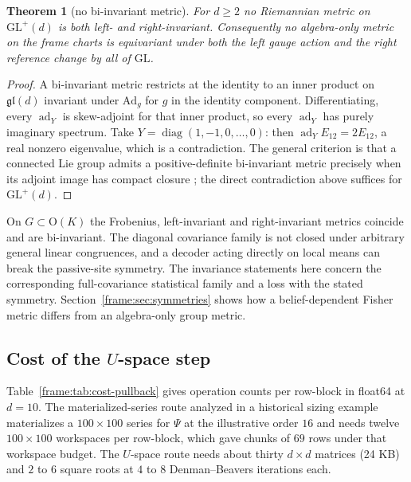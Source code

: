 \documentclass[11pt]{article}
\newtheorem{theorem}{Theorem}[section]
\theoremstyle{definition}
\theoremstyle{remark}
\providecommand{\GL}{\mathrm{GL}}
\providecommand{\gl}{\mathfrak{gl}}
\providecommand{\ad}{\operatorname{ad}}
\providecommand{\Ad}{\mathrm{Ad}}
\begin{document}
\begin{theorem}[no bi-invariant metric]\label{frame:thm:milnor}
For $d\ge2$ no Riemannian metric on $\GL^+(d)$ is both left- and right-invariant. Consequently no algebra-only metric on the frame charts is equivariant under both the left gauge action and the right reference change by all of $\GL$.
\end{theorem}
\begin{proof}
A bi-invariant metric restricts at the identity to an inner product on $\gl(d)$ invariant under $\Ad_g$ for $g$ in the identity component. Differentiating, every $\ad_Y$ is skew-adjoint for that inner product, so every $\ad_Y$ has purely imaginary spectrum. Take $Y=\operatorname{diag}(1,-1,0,\dots,0)$: then $\ad_YE_{12}=2E_{12}$, a real nonzero eigenvalue, which is a contradiction. The general criterion is that a connected Lie group admits a positive-definite bi-invariant metric precisely when its adjoint image has compact closure \cite{frame:Milnor1976}; the direct contradiction above suffices for $\GL^+(d)$.
\end{proof}

On $G\subset\mathrm{O}(K)$ the Frobenius, left-invariant and right-invariant metrics coincide and are bi-invariant. The diagonal covariance family is not closed under arbitrary general linear congruences, and a decoder acting directly on local means can break the passive-site symmetry. The invariance statements here concern the corresponding full-covariance statistical family and a loss with the stated symmetry. Section~\ref{frame:sec:symmetries} shows how a belief-dependent Fisher metric differs from an algebra-only group metric.

\subsection{Cost of the \texorpdfstring{$U$}{U}-space step}\label{frame:sec:cost-pullback}

Table~\ref{frame:tab:cost-pullback} gives operation counts per row-block in float64 at $d=10$. The materialized-series route analyzed in a historical sizing example materializes a $100\times100$ series for $\Psi$ at the illustrative order $16$ and needs twelve $100\times100$ workspaces per row-block, which gave chunks of $69$ rows under that workspace budget. The $U$-space route needs about thirty $d\times d$ matrices (24 KB) and $2$ to $6$ square roots at $4$ to $8$ Denman--Beavers iterations each.
\end{document}
